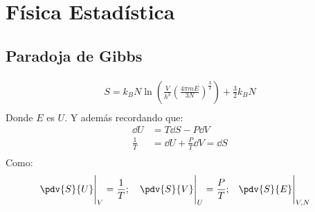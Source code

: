 \documentclass[../main]{subfiles}
\begin{document}
\chapter{Física Estadística}

\section{Paradoja de Gibbs}

\begin{align}
    S=k_B N \ln{\left(\frac{V}{h^3} \left(\frac{4\pi m E}{3N}\right)^{\frac{3}{2}}\right)} + \frac{3}{2} k_B N\\
\end{align}
Donde $E$ es $U$. Y además recordando que:
\begin{align}
    \dd U &= T\dd S - P\dd V\\
    \frac{1}{T} &= \dd U + \frac{P}{T} \dd V = \dd S\\    
\end{align}
Como:
\begin{align}
    \pdv{S}{U} \Bigg\rvert_V = \frac{1}{T}; \quad
    \pdv{S}{V} \Bigg\rvert_U =\frac{P}{T}; \quad
    & \pdv{S}{E} \Bigg\rvert_{V, N}
\end{align}
\end{document}
